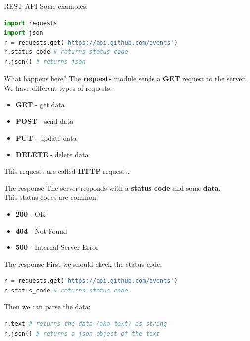 \documentclass{beamer}
\begin{document}
            \begin{frame}[fragile]{REST API}
                Some examples:
                \begin{lstlisting}[language=Python, backgroundcolor = \color{lightgray}]
import requests
import json
r = requests.get('https://api.github.com/events')
r.status_code # returns status code
r.json() # returns json
                \end{lstlisting}
            \end{frame}

                \begin{frame}{What happens here?}
                    The \textbf{requests} module sends a \textbf{GET} request to the server.\pause
                    We have different types of requests:
                    \begin{itemize}
                        \item \textbf{GET} - get data
                        \item \textbf{POST} - send data
                        \item \textbf{PUT} - update data
                        \item \textbf{DELETE} - delete data
                    \end{itemize}
                    This requests are called \textbf{HTTP} requests.
                \end{frame}
                
                \begin{frame}{The response}
                    The server responds with a \textbf{status code} and some \textbf{data}.\\\pause
                    This status codes are common:
                    \begin{itemize}
                        \item \textbf{200} - OK
                        \item \textbf{404} - Not Found
                        \item \textbf{500} - Internal Server Error
                    \end{itemize}
                \end{frame}

                \begin{frame}[fragile]{The response}
                    First we should check the status code:
                    \begin{lstlisting}[language=Python, backgroundcolor = \color{lightgray}]
r = requests.get('https://api.github.com/events')
r.status_code # returns status code
                    \end{lstlisting}
                    \pause
                    Then we can parse the data:
                    \begin{lstlisting}[language=Python, backgroundcolor = \color{lightgray}]
r.text # returns the data (aka text) as string
r.json() # returns a json object of the text
    \end{lstlisting}
                \end{frame}
\end{document}
